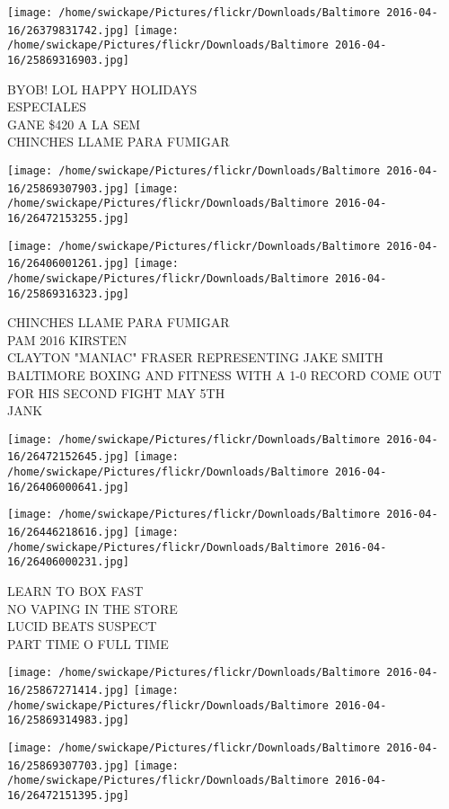\documentclass[10pt,letterpaper]{article}
\begin{document}
\texttt{[image: /home/swickape/Pictures/flickr/Downloads/Baltimore 2016-04-16/26379831742.jpg]}
\texttt{[image: /home/swickape/Pictures/flickr/Downloads/Baltimore 2016-04-16/25869316903.jpg]}

BYOB! LOL HAPPY HOLIDAYS\\
ESPECIALES\\
GANE \$420 A LA SEM\\
CHINCHES LLAME PARA FUMIGAR\\
\pagebreak

\texttt{[image: /home/swickape/Pictures/flickr/Downloads/Baltimore 2016-04-16/25869307903.jpg]}
\texttt{[image: /home/swickape/Pictures/flickr/Downloads/Baltimore 2016-04-16/26472153255.jpg]}

\texttt{[image: /home/swickape/Pictures/flickr/Downloads/Baltimore 2016-04-16/26406001261.jpg]}
\texttt{[image: /home/swickape/Pictures/flickr/Downloads/Baltimore 2016-04-16/25869316323.jpg]}

CHINCHES LLAME PARA FUMIGAR\\
PAM 2016 KIRSTEN\\
CLAYTON "MANIAC" FRASER REPRESENTING JAKE SMITH BALTIMORE BOXING AND FITNESS WITH A 1{-}0 RECORD COME OUT FOR HIS SECOND FIGHT MAY 5TH\\
JANK\\
\pagebreak

\texttt{[image: /home/swickape/Pictures/flickr/Downloads/Baltimore 2016-04-16/26472152645.jpg]}
\texttt{[image: /home/swickape/Pictures/flickr/Downloads/Baltimore 2016-04-16/26406000641.jpg]}

\texttt{[image: /home/swickape/Pictures/flickr/Downloads/Baltimore 2016-04-16/26446218616.jpg]}
\texttt{[image: /home/swickape/Pictures/flickr/Downloads/Baltimore 2016-04-16/26406000231.jpg]}

LEARN TO BOX FAST\\
NO VAPING IN THE STORE\\
LUCID BEATS SUSPECT\\
PART TIME O FULL TIME\\
\pagebreak

\texttt{[image: /home/swickape/Pictures/flickr/Downloads/Baltimore 2016-04-16/25867271414.jpg]}
\texttt{[image: /home/swickape/Pictures/flickr/Downloads/Baltimore 2016-04-16/25869314983.jpg]}

\texttt{[image: /home/swickape/Pictures/flickr/Downloads/Baltimore 2016-04-16/25869307703.jpg]}
\texttt{[image: /home/swickape/Pictures/flickr/Downloads/Baltimore 2016-04-16/26472151395.jpg]}
\end{document}
